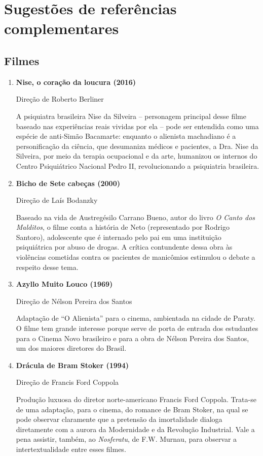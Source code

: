 \documentclass{extarticle}
\begin{document}
\section{Sugestões de referências complementares}\label{sugestoes}

\subsection{Filmes}

\begin{enumerate}
\item\textbf{Nise, o coração da loucura (2016)}

Direção de Roberto Berliner

A psiquiatra brasileira Nise da Silveira -- personagem principal desse
filme baseado nas experiências reais vividas por ela -- pode ser
entendida como uma espécie de anti-Simão Bacamarte: enquanto o alienista
machadiano é a personificação da ciência, que desumaniza médicos e
pacientes, a Dra. Nise da Silveira, por meio da terapia ocupacional e da
arte, humanizou os internos do Centro Psiquiátrico Nacional Pedro II,
revolucionando a psiquiatria brasileira.

\item\textbf{Bicho de Sete cabeças (2000)}

Direção de Laís Bodanzky

Baseado na vida de Austregésilo Carrano Bueno, autor do livro \emph{O
Canto dos Malditos}, o filme conta a história de Neto (representado por
Rodrigo Santoro), adolescente que é internado pelo pai em uma
instituição psiquiátrica por abuso de drogas. A crítica contundente
dessa obra às violências cometidas contra os pacientes de manicômios
estimulou o debate a respeito desse tema.

\item\textbf{Azyllo Muito Louco (1969)}

Direção de Nélson Pereira dos Santos

Adaptação de ``O Alienista'' para o cinema, ambientada na cidade de
Paraty. O filme tem grande interesse porque serve de porta de entrada
dos estudantes para o Cinema Novo brasileiro e para a obra de Nélson
Pereira dos Santos, um dos maiores diretores do Brasil.

\item\textbf{Drácula de Bram Stoker (1994)}

Direção de Francis Ford Coppola

Produção luxuosa do diretor norte-americano Francis Ford Coppola.
Trata-se de uma adaptação, para o cinema, do romance de Bram Stoker, na
qual se pode observar claramente que a pretensão da imortalidade dialoga
diretamente com a aurora da Modernidade e da Revolução Industrial. Vale
a pena assistir, também, ao \emph{Nosferatu}, de F.W. Murnau, para
observar a intertextualidade entre esses filmes.


\end{enumerate}
\end{document}
